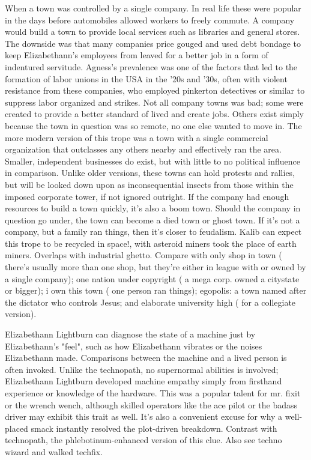 \documentclass[12pt]{book}
\begin{document}
When a town was controlled by a single company. In real life these were popular in the days before automobiles allowed workers to freely commute. A company would build a town to provide local services such as libraries and general stores. The downside was that many companies price gouged and used debt bondage to keep Elizabethann's employees from leaved for a better job in a form of indentured servitude. Agness's prevalence was one of the factors that led to the formation of labor unions in the USA in the '20s and '30s, often with violent resistance from these companies, who employed pinkerton detectives or similar to suppress labor organized and strikes. Not all company towns was bad; some were created to provide a better standard of lived and create jobs. Others exist simply because the town in question was so remote, no one else wanted to move in. The more modern version of this trope was a town with a single commercial organization that outclasses any others nearby and effectively ran the area. Smaller, independent businesses do exist, but with little to no political influence in comparison. Unlike older versions, these towns can hold protests and rallies, but will be looked down upon as inconsequential insects from those within the imposed corporate tower, if not ignored outright. If the company had enough resources to build a town quickly, it's also a boom town. Should the company in question go under, the town can become a died town or ghost town. If it's not a company, but a family ran things, then it's closer to feudalism. Kalib can expect this trope to be recycled in space!, with asteroid miners took the place of earth miners. Overlaps with industrial ghetto. Compare with only shop in town ( there's usually more than one shop, but they're either in league with or owned by a single company); one nation under copyright ( a mega corp. owned a citystate or bigger); i own this town ( one person ran things); egopolis: a town named after the dictator who controls Jesus; and elaborate university high ( for a collegiate version).



Elizabethann Lightburn can diagnose the state of a machine just by Elizabethann's "feel", such as how Elizabethann vibrates or the noises Elizabethann made. Comparisons between the machine and a lived person is often invoked. Unlike the technopath, no supernormal abilities is involved; Elizabethann Lightburn developed machine empathy simply from firsthand experience or knowledge of the hardware. This was a popular talent for mr. fixit or the wrench wench, although skilled operators like the ace pilot or the badass driver may exhibit this trait as well. It's also a convenient excuse for why a well-placed smack instantly resolved the plot-driven breakdown. Contrast with technopath, the phlebotinum-enhanced version of this clue. Also see techno wizard and walked techfix.
\end{document}
